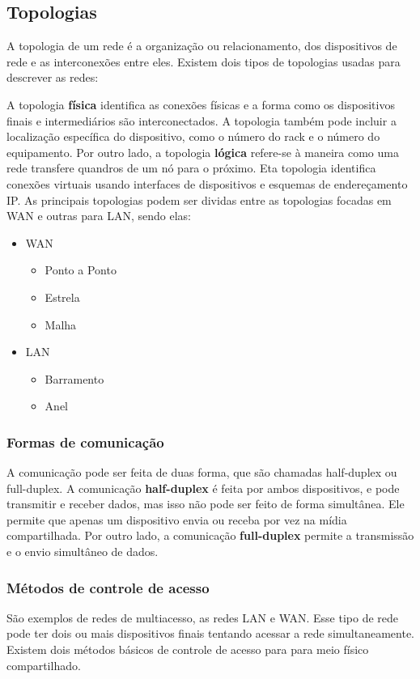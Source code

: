\documentclass[12pt a4paper]{paper}
\begin{document}
\subsection{Topologias} %
\label{sub:Topologias}
A topologia de um rede é a organização ou relacionamento, 
dos dispositivos de rede e as interconexões entre eles. 
Existem dois tipos de topologias usadas para descrever 
as redes: 

A topologia \textbf{física} identifica as conexões físicas 
e a forma como os dispositivos finais e intermediários são 
interconectados. A topologia também pode incluir a 
localização específica do dispositivo, como o número do rack 
e o número do equipamento. Por outro lado, a topologia 
\textbf{lógica} refere-se à maneira como uma rede transfere
quandros de um nó para o próximo. Eta topologia identifica 
conexões virtuais usando interfaces de dispositivos e 
esquemas de endereçamento IP. As principais topologias 
podem ser dividas entre as topologias focadas em WAN e 
outras para LAN, sendo elas: 

\begin{itemize}
  \item WAN
  \begin{itemize}
    \item Ponto a Ponto
    \item Estrela 
    \item Malha
  \end{itemize}
  \item LAN 
  \begin{itemize}
    \item Barramento
    \item Anel
  \end{itemize}
\end{itemize}

\subsubsection{Formas de comunicação} %
\label{sec:Formas de comunicação}
A comunicação pode ser feita de duas forma, que são chamadas 
half-duplex ou full-duplex. A comunicação \textbf{half-duplex} é feita por ambos dispositivos, e pode transmitir e 
receber dados, mas isso não pode ser feito de forma 
simultânea. Ele permite que apenas um dispositivo envia ou 
receba por vez na mídia compartilhada. Por outro lado, 
a comunicação \textbf{full-duplex} permite a transmissão e 
o envio simultâneo de dados. 

\subsubsection{Métodos de controle de acesso} %
\label{sec:Métodos de controle de acesso}
São exemplos de redes de multiacesso, as redes LAN e WAN. 
Esse tipo de rede pode ter dois ou mais dispositivos finais 
tentando acessar a rede simultaneamente. Existem dois  
métodos básicos de controle de acesso para para meio físico 
compartilhado. 
\end{document}

